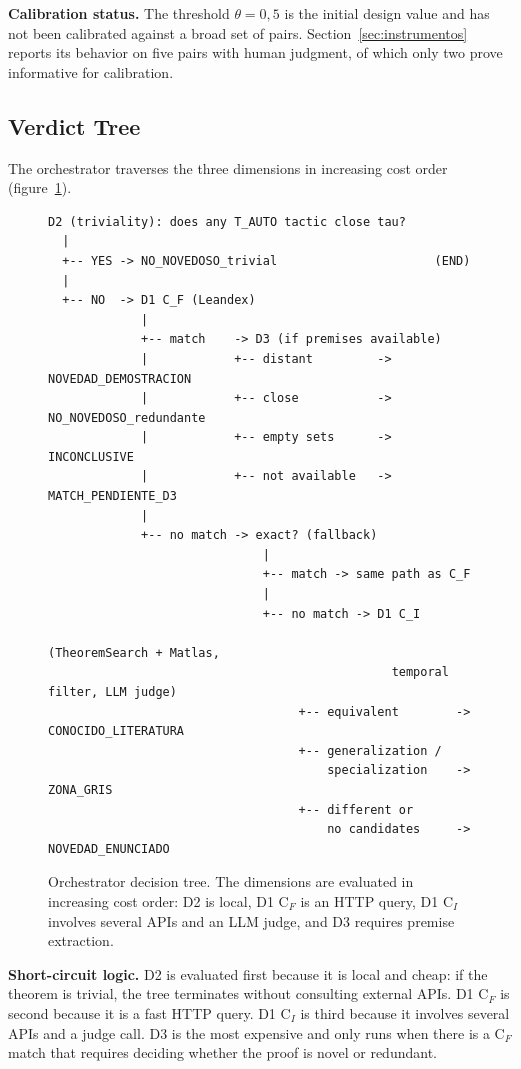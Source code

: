 \textbf{Calibration status.} The threshold $\theta = 0{,}5$ is the initial design value and has not been calibrated against a broad set of pairs. Section~\ref{sec:instrumentos} reports its behavior on five pairs with human judgment, of which only two prove informative for calibration.

\subsection{Verdict Tree}

The orchestrator traverses the three dimensions in increasing cost order (figure~\ref{fig:arbol}).

\begin{figure}[htbp]
\centering
\small
\begin{verbatim}
D2 (triviality): does any T_AUTO tactic close tau?
  |
  +-- YES -> NO_NOVEDOSO_trivial                      (END)
  |
  +-- NO  -> D1 C_F (Leandex)
             |
             +-- match    -> D3 (if premises available)
             |            +-- distant         -> NOVEDAD_DEMOSTRACION
             |            +-- close           -> NO_NOVEDOSO_redundante
             |            +-- empty sets      -> INCONCLUSIVE
             |            +-- not available   -> MATCH_PENDIENTE_D3
             |
             +-- no match -> exact? (fallback)
                              |
                              +-- match -> same path as C_F
                              |
                              +-- no match -> D1 C_I
                                               (TheoremSearch + Matlas,
                                                temporal filter, LLM judge)
                                   +-- equivalent        -> CONOCIDO_LITERATURA
                                   +-- generalization /
                                       specialization    -> ZONA_GRIS
                                   +-- different or
                                       no candidates     -> NOVEDAD_ENUNCIADO
\end{verbatim}
\caption{Orchestrator decision tree. The dimensions are evaluated in increasing cost order: D2 is local, D1 C$_F$ is an HTTP query, D1 C$_I$ involves several APIs and an LLM judge, and D3 requires premise extraction.}
\label{fig:arbol}
\end{figure}

\textbf{Short-circuit logic.} D2 is evaluated first because it is local and cheap: if the theorem is trivial, the tree terminates without consulting external APIs. D1 C$_F$ is second because it is a fast HTTP query. D1 C$_I$ is third because it involves several APIs and a judge call. D3 is the most expensive and only runs when there is a C$_F$ match that requires deciding whether the proof is novel or redundant.

